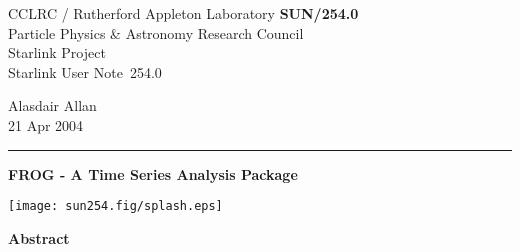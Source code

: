 \documentclass[twoside,11pt]{article}
\newcommand{\stardoccategory}  {Starlink User Note}
\newcommand{\stardocinitials}  {SUN}
\newcommand{\stardocnumber}    {254.0}
\newcommand{\stardocauthors}   {Alasdair Allan}
\newcommand{\stardocdate}      {21 Apr 2004}
\newcommand{\stardoctitle}     {FROG - A Time Series Analysis Package}
\newcommand{\stardocname}{\stardocinitials /\stardocnumber}
\newenvironment{latexonly}{}{}
\renewcommand{\_}{\texttt{\symbol{95}}}
\begin{document}
\thispagestyle{empty}

\begin{latexonly}
   CCLRC / Rutherford Appleton Laboratory \hfill \textbf{\stardocname}\\
   {\large Particle Physics \& Astronomy Research Council}\\
   {\large Starlink Project\\}
   {\large \stardoccategory\ \stardocnumber}
   \begin{flushright}
   \stardocauthors\\
   \stardocdate
   \end{flushright}
   \vspace{-4mm}
   \rule{\textwidth}{0.5mm}
   \vspace{5mm}
   \begin{center}
      {\LARGE\textbf{\stardoctitle \\ [2.5ex]}}
   \end{center}
   \vspace{5mm}

\begin{center}
\texttt{[image: sun254.fig/splash.eps]}
\end{center}

   \begin{center}
      {\Large\textbf{Abstract}}
   \end{center}
\end{latexonly}
\end{document}
